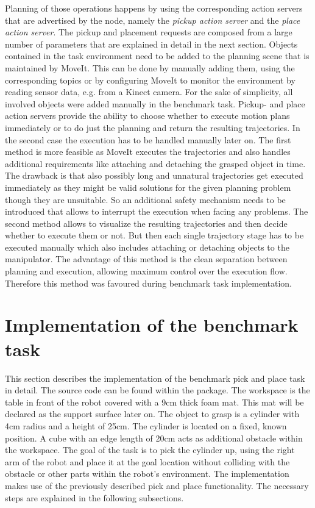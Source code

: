 Planning of those operations happens by using the corresponding action servers that are advertised by the  node, namely the \emph{pickup action server} and the \emph{place action server}.  The pickup and placement requests are composed from a large number of parameters that are explained in detail in the next section. Objects contained in the task environment need to be added to the planning scene that is maintained by MoveIt. This can be done by manually adding them, using the corresponding topics or by configuring MoveIt to monitor the environment by reading sensor data, e.g. from a Kinect camera. For the sake of simplicity, all involved objects were added manually in the benchmark task. Pickup- and place action servers provide the ability to choose whether to execute motion plans immediately or to do just the planning and return the resulting trajectories. In the second case the execution has to be handled manually later on. The first method is more feasible as MoveIt executes the trajectories and also handles additional requirements like attaching and detaching the grasped object in time. The drawback is that also possibly long and unnatural trajectories get executed immediately as they might be valid solutions for the given planning problem though they are unsuitable. So an additional safety mechanism needs to be introduced that allows to interrupt the execution when facing any problems. The second method allows to visualize the resulting trajectories and then decide whether to execute them or not. But then each single trajectory stage has to be executed manually which also includes attaching or detaching objects to the manipulator. The advantage of this method is the clean separation between planning and execution, allowing maximum control over the execution flow. Therefore this method was favoured during benchmark task implementation.

\section{Implementation of the benchmark task}

This section describes the implementation of the benchmark pick and place task in detail. The source code can be found within the  package. The workspace is the table in front of the robot covered with a 9cm thick foam mat. This mat will be declared as the support surface later on. The object to grasp is a cylinder with 4cm radius and a height of 25cm. The cylinder is located on a fixed, known position. A cube with an edge length of 20cm acts as additional obstacle within the workspace. The goal of the task is to pick the cylinder up, using the right arm of the robot and place it at the goal location without colliding with the obstacle or other parts within the robot's environment. The implementation makes use of the previously described pick and place functionality. The necessary steps are explained in the following subsections.

